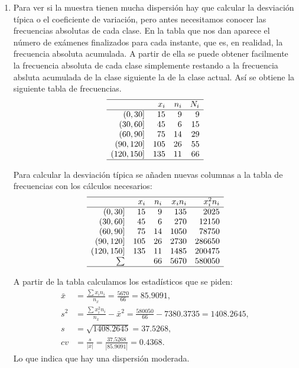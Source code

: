 {\begin{enumerate}
\item Para ver si la muestra tienen mucha dispersión hay que calcular la desviación típica o el coeficiente de variación, pero antes necesitamos
conocer las frecuencias absolutas de cada clase. En la tabla que nos dan aparece el número de exámenes finalizados para cada instante, que es,
en realidad, la frecuencia absoluta acumulada. A partir de ella se puede obtener facilmente la frecuencia absoluta de cada clase simplemente
restando a la frecuencia absluta acumulada de la clase siguiente la de la clase actual. Así se obtiene la siguiente tabla de frecuencias.
\[
\begin{array}{rrrr}
  \hline
 & x_i & n_i & N_i \\
  \hline
(0,30] & 15 & 9 & 9 \\
  (30,60] & 45 & 6 & 15 \\
  (60,90] & 75 & 14 & 29 \\
  (90,120] & 105 & 26 & 55 \\
  (120,150] & 135 & 11 & 66 \\
   \hline
\end{array}\]

Para calcular la desviación típica se añaden nuevas columnas a la tabla de frecuencias con los cálculos necesarios:
\[
\begin{array}{rrrrr}
  \hline
 & x_i & n_i & x_in_i & x_i^2n_i \\
  \hline
(0,30] & 15 & 9 & 135 & 2025 \\
  (30,60] & 45 & 6 & 270 & 12150 \\
  (60,90] & 75 & 14 & 1050 & 78750 \\
  (90,120] & 105 & 26 & 2730 & 286650 \\
  (120,150] & 135 & 11 & 1485 & 200475 \\
  \sum &  & 66 & 5670 & 580050 \\
   \hline
\end{array}\]

A partir de la tabla calculamos los estadísticos que se piden:
\begin{align*}
\bar x &= \frac{\sum x_in_i}{n_x} = \frac{5670}{66} = 85.9091,\\
s^2 & = \frac{\sum x_i^2n_i}{n_x}-\bar x^2 = \frac{580050}{66}-7380.3735 = 1408.2645,\\
s & = \sqrt{1408.2645} = 37.5268,\\
cv & = \frac{s}{|\bar x|} = \frac{37.5268}{|85.9091|} = 0.4368.
\end{align*}
Lo que indica que hay una dispersión moderada.


\end{enumerate}}
